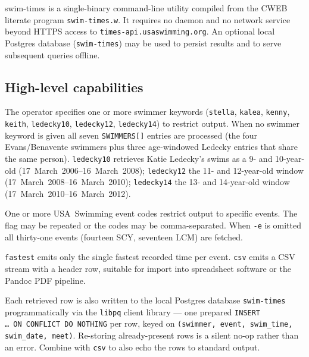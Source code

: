 \documentclass[12pt]{article}
\newcommand{\code}[1]{\texttt{#1}}
\begin{document}
swim-times is a single-binary command-line utility compiled from
the CWEB literate program \code{swim-times.w}.  It requires no
daemon and no network service beyond HTTPS access to
\texttt{times-api.usaswimming.org}.  An optional local Postgres
database (\texttt{swim-times}) may be used to persist results and
to serve subsequent queries offline.

\subsection{High-level capabilities}

\begin{description}[style=nextline]
  \item[Swimmer selection (\code{-o} flag).]
        The operator specifies one or more swimmer keywords
        (\code{stella}, \code{kalea}, \code{kenny}, \code{keith},
        \code{ledecky10}, \code{ledecky12}, \code{ledecky14}) to
        restrict output.  When no swimmer keyword is given all
        seven \texttt{SWIMMERS[]} entries are processed (the four
        Evans/Benavente swimmers plus three age-windowed Ledecky
        entries that share the same person).  \code{ledecky10}
        retrieves Katie Ledecky's swims as a 9- and 10-year-old
        (17~March~2006--16~March~2008); \code{ledecky12} the 11-
        and 12-year-old window (17~March~2008--16~March~2010);
        \code{ledecky14} the 13- and 14-year-old window
        (17~March~2010--16~March~2012).

  \item[Event filtering (\code{-e} flag).]
        One or more USA~Swimming event codes restrict output to
        specific events.  The flag may be repeated or the codes
        may be comma-separated.  When \code{-e} is omitted all
        thirty-one events (fourteen SCY, seventeen LCM) are fetched.

  \item[Output modes.]
        \code{fastest} emits only the single fastest recorded time
        per event.  \code{csv} emits a CSV stream with a header
        row, suitable for import into spreadsheet software or the
        Pandoc PDF pipeline.

  \item[Database persistence (\code{store} keyword).]
        Each retrieved row is also written to the local Postgres
        database \texttt{swim-times} programmatically via the
        \texttt{libpq} client library --- one prepared
        \texttt{INSERT \dots\ ON~CONFLICT~DO~NOTHING} per row,
        keyed on \texttt{(swimmer, event, swim\_time, swim\_date,
        meet)}.  Re-storing already-present rows is a silent
        no-op rather than an error.  Combine with \code{csv} to
        also echo the rows to standard output.


\end{description}
\end{document}
